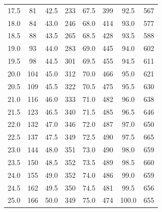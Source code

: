 {\begin{longtable}{cccccccc}
17.5 & 81 & 42.5 & 233 & 67.5 & 399 & 92.5 & 567 \\

18.0 & 84 & 43.0 & 246 & 68.0 & 414 & 93.0 & 577 \\

18.5 & 88 & 43.5 & 265 & 68.5 & 428 & 93.5 & 588 \\

19.0 & 93 & 44.0 & 283 & 69.0 & 445 & 94.0 & 602 \\

19.5 & 98 & 44.5 & 301 & 69.5 & 455 & 94.5 & 611 \\

20.0 & 104 & 45.0 & 312 & 70.0 & 466 & 95.0 & 621 \\

20.5 & 109 & 45.5 & 322 & 70.5 & 475 & 95.5 & 630 \\

21.0 & 116 & 46.0 & 333 & 71.0 & 482 & 96.0 & 638 \\

21.5 & 123 & 46.5 & 340 & 71.5 & 485 & 96.5 & 646 \\

22.0 & 132 & 47.0 & 346 & 72.0 & 487 & 97.0 & 650 \\

22.5 & 137 & 47.5 & 349 & 72.5 & 490 & 97.5 & 665 \\

23.0 & 144 & 48.0 & 351 & 73.0 & 490 & 98.0 & 659 \\

23.5 & 150 & 48.5 & 352 & 73.5 & 489 & 98.5 & 660 \\

24.0 & 155 & 49.0 & 352 & 74.0 & 486 & 99.0 & 659 \\

24.5 & 162 & 49.5 & 350 & 74.5 & 481 & 99.5 & 656 \\

25.0 & 166 & 50.0 & 349 & 75.0 & 474 & 100.0 & 655 \\

\end{longtable}
}

\endgroup
